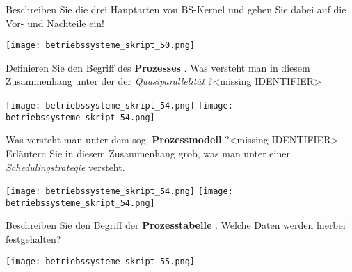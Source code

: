 \documentclass{article}
\begin{document}
\begin{tcolorbox}[colback=white!10!white,colframe=lightgray!75!black,
  savelowerto=\jobname_ex.tex]

\begin{center}
Beschreiben Sie die drei Hauptarten von BS-Kernel und gehen Sie dabei auf die Vor- und Nachteile ein!

\end{center}

\tcblower

\justifying
\texttt{[image: betriebssysteme\_skript\_50.png]}

\end{tcolorbox}
\begin{tcolorbox}[colback=white!10!white,colframe=lightgray!75!black,
  savelowerto=\jobname_ex.tex]

\begin{center}
Definieren Sie den Begriff des 
\textbf{Prozesses
}. 
Was versteht man in diesem Zusammenhang unter der der 
\textit{Quasiparallelität
}?<missing IDENTIFIER>

\end{center}

\tcblower

\justifying
\texttt{[image: betriebssysteme\_skript\_54.png]}
\texttt{[image: betriebssysteme\_skript\_54.png]}

\end{tcolorbox}
\begin{tcolorbox}[colback=white!10!white,colframe=lightgray!75!black,
  savelowerto=\jobname_ex.tex]

\begin{center}
Was versteht man unter dem sog. 
\textbf{Prozessmodell
}?<missing IDENTIFIER>
Erläutern Sie in diesem Zusammenhang grob, was man unter einer 
\textit{Schedulingstrategie
} versteht.

\end{center}

\tcblower

\justifying
\texttt{[image: betriebssysteme\_skript\_54.png]}
\texttt{[image: betriebssysteme\_skript\_54.png]}

\end{tcolorbox}
\begin{tcolorbox}[colback=white!10!white,colframe=lightgray!75!black,
  savelowerto=\jobname_ex.tex]

\begin{center}
Beschreiben Sie den Begriff der 
\textbf{Prozesstabelle
}.
Welche Daten werden hierbei festgehalten?

\end{center}

\tcblower

\justifying
\texttt{[image: betriebssysteme\_skript\_55.png]}

\end{tcolorbox}
\end{document}
